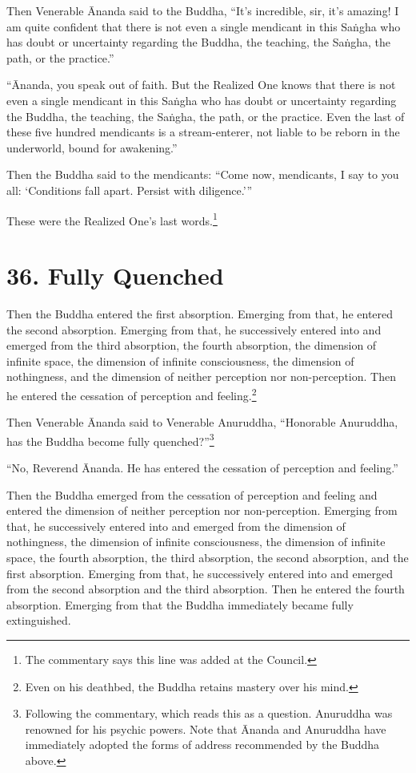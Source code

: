 \documentclass[12pt,openany]{book}%
\begin{document}
Then Venerable Ānanda said to the Buddha, “It’s incredible, sir, it’s amazing! I am quite confident that there is not even a single mendicant in this \textsanskrit{Saṅgha} who has doubt or uncertainty regarding the Buddha, the teaching, the \textsanskrit{Saṅgha}, the path, or the practice.” 

“Ānanda, you speak out of faith. But the Realized One knows that there is not even a single mendicant in this \textsanskrit{Saṅgha} who has doubt or uncertainty regarding the Buddha, the teaching, the \textsanskrit{Saṅgha}, the path, or the practice. Even the last of these five hundred mendicants is a stream-enterer, not liable to be reborn in the underworld, bound for awakening.” 

Then the Buddha said to the mendicants: “Come now, mendicants, I say to you all: ‘Conditions fall apart. Persist with diligence.’” 

These were the Realized One’s last words.\footnote{The commentary says this line was added at the Council. } 

\section*{36. Fully Quenched }

Then the Buddha entered the first absorption. Emerging from that, he entered the second absorption. Emerging from that, he successively entered into and emerged from the third absorption, the fourth absorption, the dimension of infinite space, the dimension of infinite consciousness, the dimension of nothingness, and the dimension of neither perception nor non-perception. Then he entered the cessation of perception and feeling.\footnote{Even on his deathbed, the Buddha retains mastery over his mind. } 

Then Venerable Ānanda said to Venerable Anuruddha, “Honorable Anuruddha, has the Buddha become fully quenched?”\footnote{Following the commentary, which reads this as a question. Anuruddha was renowned for his psychic powers. Note that Ānanda and Anuruddha have immediately adopted the forms of address recommended by the Buddha above. } 

“No, Reverend Ānanda. He has entered the cessation of perception and feeling.” 

Then the Buddha emerged from the cessation of perception and feeling and entered the dimension of neither perception nor non-perception. Emerging from that, he successively entered into and emerged from the dimension of nothingness, the dimension of infinite consciousness, the dimension of infinite space, the fourth absorption, the third absorption, the second absorption, and the first absorption. Emerging from that, he successively entered into and emerged from the second absorption and the third absorption. Then he entered the fourth absorption. Emerging from that the Buddha immediately became fully extinguished. 
\end{document}
